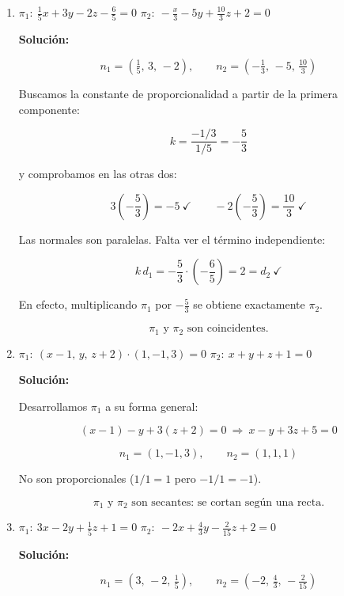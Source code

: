\documentclass[12pt]{article}
\newcommand{\solucion}{%
    \vspace{0.8em}%
    \textbf{Solución:}%
    \vspace{0.8em}%
}
\begin{document}
\begin{enumerate}[label=\alph*.-]

    \item $\pi_1:\ \tfrac{1}{5}x+3y-2z-\tfrac{6}{5}=0$ \qquad
    $\pi_2:\ -\tfrac{x}{3}-5y+\tfrac{10}{3}z+2=0$

    \solucion

    \[
    n_1=\left(\tfrac{1}{5},\,3,\,-2\right),\qquad
    n_2=\left(-\tfrac{1}{3},\,-5,\,\tfrac{10}{3}\right)
    \]

    Buscamos la constante de proporcionalidad a partir de la primera
    componente:

    \[
    k=\frac{-1/3}{1/5}=-\frac{5}{3}
    \]

    y comprobamos en las otras dos:

    \[
    3\left(-\frac{5}{3}\right)=-5\ \checkmark\qquad
    -2\left(-\frac{5}{3}\right)=\frac{10}{3}\ \checkmark
    \]

    Las normales son paralelas. Falta ver el término independiente:

    \[
    k\,d_1=-\frac{5}{3}\cdot\left(-\frac{6}{5}\right)=2=d_2\ \checkmark
    \]

    En efecto, multiplicando $\pi_1$ por $-\tfrac{5}{3}$ se obtiene
    exactamente $\pi_2$.

    \[
    \boxed{\pi_1 \text{ y } \pi_2 \text{ son coincidentes.}}
    \]

    \item $\pi_1:\ (x-1,\,y,\,z+2)\cdot(1,-1,3)=0$ \qquad
    $\pi_2:\ x+y+z+1=0$

    \solucion

    Desarrollamos $\pi_1$ a su forma general:

    \[
    (x-1)-y+3(z+2)=0\ \Longrightarrow\ x-y+3z+5=0
    \]

    \[
    n_1=(1,-1,3),\qquad n_2=(1,1,1)
    \]

    No son proporcionales ($1/1=1$ pero $-1/1=-1$).

    \[
    \boxed{\pi_1 \text{ y } \pi_2 \text{ son secantes: se cortan según una recta.}}
    \]

    \item $\pi_1:\ 3x-2y+\tfrac{1}{5}z+1=0$ \qquad
    $\pi_2:\ -2x+\tfrac{4}{3}y-\tfrac{2}{15}z+2=0$

    \solucion

    \[
    n_1=\left(3,\,-2,\,\tfrac{1}{5}\right),\qquad
    n_2=\left(-2,\,\tfrac{4}{3},\,-\tfrac{2}{15}\right)
    \]


\end{enumerate}
\end{document}
